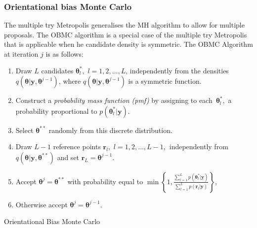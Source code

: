 \documentclass[article]{jss}
\begin{document}
\subsubsection{Orientational bias Monte Carlo}

The multiple try Metropolis \citep{LuiLiangWong2000} generalises the
MH algorithm to allow for multiple proposals. The OBMC algorithm is a
special case of the multiple try Metropolis that is applicable when he
candidate density is symmetric. The OBMC Algorithm at iteration $j$ is
as follows:

%
\begin{algorithm}[H]
\begin{enumerate}
\item Draw $L$ candidates $\bm{\theta}_{l}^{\ast},$ $l=1,2,\ldots,L$,
  independently from the densities
  $q\left(\bm{\theta}|\bm{y},\bm{\theta}^{j-1}\right)$, where
  $q\left(\bm{\theta}|\bm{y},\bm{\theta}^{j-1}\right)$ is a symmetric
  function.
\item Construct a \textit{probability mass function (pmf)} by
  assigning to each\emph{\ }$\bm{\theta}_{l}^{\ast},$ a probability
  proportional to $p\left(\bm{\theta}_{l}^{\ast}|\bm{y}\right).$
\item Select $\bm{\theta}^{\ast\ast}$ randomly from this discrete
  distribution.
\item Draw $L-1$ reference points $\bm{r}_{l},$
  $l=1,2,\ldots,L-1$,\textbf{\ }independently from
  $q\left(\bm{\theta}|\bm{y},\bm{\theta}^{\ast\ast}\right)$ and set
  $\bm{r}_{L}=\bm{\theta}^{j-1}.$
\item Accept $\bm{\theta}^{j}=\bm{\theta}^{\ast\ast}$ with probability
  equal to $\min\left\{
    1,\frac{\sum_{l=1}^{L}p\left(\bm{\theta}_{l}^{\ast}|\bm{y}\right)}{\sum_{l=1}^{L}p\left(\bm{r}_{l}|\bm{y}\right)}\right\}
  $,
\item Otherwise accept $\bm{\theta}^{j}=\bm{\theta}^{j-1}.$
\end{enumerate}
\caption{Orientational Bias Monte Carlo}
\label{alg:obmc}
\end{algorithm}
\end{document}

